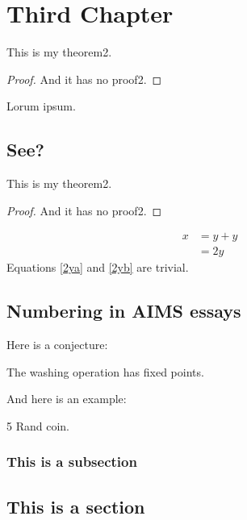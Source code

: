 \chapter{Third Chapter}

\lipsum[1]

\begin{thm}[My Theorem2]
This is my theorem2.
\end{thm}
\begin{proof}
And it has no proof2.
\end{proof}

Lorum ipsum.

\section{See?}

\lipsum[1]

\begin{thm}[My Theorem2]
This is my theorem2.
\end{thm}
\begin{proof}
And it has no proof2.
\end{proof}

\lipsum[1]

\begin{align} %
\label{2ya}
x & = y + y\\
\label{2yb}
& = 2y
\end{align}
Equations \eqref{2ya} and \eqref{2yb} are trivial.

\section{Numbering in AIMS essays}

Here is a conjecture:

\begin{conj}
The washing operation has fixed points.
\end{conj}

And here is an example:

\begin{exa}
5 Rand coin.
\end{exa}

\subsection{This is a subsection}

\lipsum[1]

\section{This is a section}

\lipsum[1]



